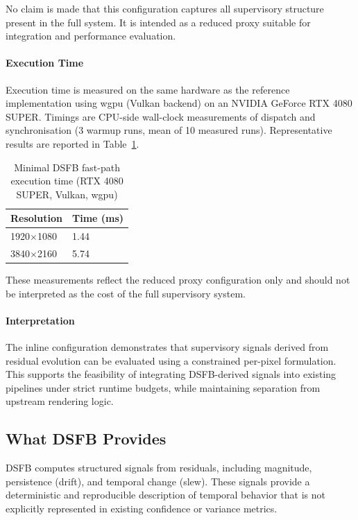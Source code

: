 \documentclass[11pt,letterpaper]{article}
\theoremstyle{gcresult}
\theoremstyle{definition}
\begin{document}
No claim is made that this configuration captures all supervisory structure present in the full system. It is intended as a reduced proxy suitable for integration and performance evaluation.

\paragraph{Execution Time}

Execution time is measured on the same hardware as the reference implementation using wgpu (Vulkan backend) on an NVIDIA GeForce RTX 4080 SUPER. Timings are CPU-side wall-clock measurements of dispatch and synchronisation (3 warmup runs, mean of 10 measured runs). Representative results are reported in Table~\ref{tab:dsfb_fastpath}.

\begin{table}[H]
\centering
\caption{Minimal DSFB fast-path execution time (RTX 4080 SUPER, Vulkan, wgpu)}
\label{tab:dsfb_fastpath}
\begin{tabular}{l l}
\hline
Resolution & Time (ms) \\
\hline
1920$\times$1080 & 1.44 \\
3840$\times$2160 & 5.74 \\
\hline
\end{tabular}
\end{table}

These measurements reflect the reduced proxy configuration only and should not be interpreted as the cost of the full supervisory system.

\paragraph{Interpretation}

The inline configuration demonstrates that supervisory signals derived from residual evolution can be evaluated using a constrained per-pixel formulation. This supports the feasibility of integrating DSFB-derived signals into existing pipelines under strict runtime budgets, while maintaining separation from upstream rendering logic.



\subsection{What DSFB Provides}
DSFB computes structured signals from residuals, including magnitude, persistence (drift), and temporal change (slew). These signals provide a deterministic and reproducible description of temporal behavior that is not explicitly represented in existing confidence or variance metrics.
\end{document}
